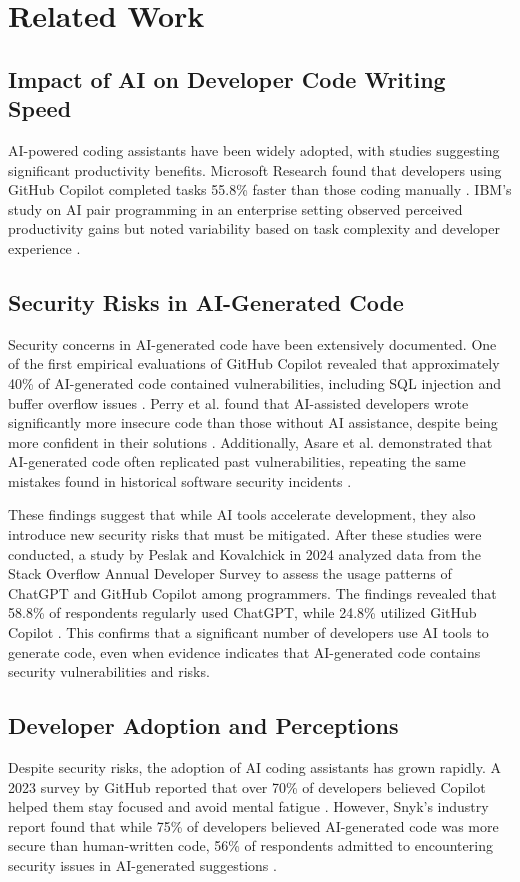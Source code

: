 \section{Related Work}

\subsection{Impact of AI on Developer Code Writing Speed}
AI-powered coding assistants have been widely adopted, with studies suggesting significant productivity benefits. Microsoft Research found that developers using GitHub Copilot completed tasks 55.8\% faster than those coding manually \cite{peng2023impact}. IBM’s study on AI pair programming in an enterprise setting observed perceived productivity gains but noted variability based on task complexity and developer experience \cite{weisz2025examining}.


\subsection{Security Risks in AI-Generated Code}
Security concerns in AI-generated code have been extensively documented. One of the first empirical evaluations of GitHub Copilot revealed that approximately 40\% of AI-generated code contained vulnerabilities, including SQL injection and buffer overflow issues \cite{fu2025security}. Perry et al. found that AI-assisted developers wrote significantly more insecure code than those without AI assistance, despite being more confident in their solutions \cite{perry2023}. Additionally, Asare et al. demonstrated that AI-generated code often replicated past vulnerabilities, repeating the same mistakes found in historical software security incidents \cite{asare2024}. 

These findings suggest that while AI tools accelerate development, they also introduce new security risks that must be mitigated. After these studies were conducted, a study by Peslak and Kovalchick in 2024 analyzed data from the Stack Overflow Annual Developer Survey to assess the usage patterns of ChatGPT and GitHub Copilot among programmers. The findings revealed that 58.8\% of respondents regularly used ChatGPT, while 24.8\% utilized GitHub Copilot \cite{peslak2024ai}. This confirms that a significant number of developers use AI tools to generate code, even when evidence indicates that AI-generated code contains security vulnerabilities and risks.

\subsection{Developer Adoption and Perceptions}
Despite security risks, the adoption of AI coding assistants has grown rapidly. A 2023 survey by GitHub reported that over 70\% of developers believed Copilot helped them stay focused and avoid mental fatigue \cite{githubSurvey}. However, Snyk’s industry report found that while 75\% of developers believed AI-generated code was more secure than human-written code, 56\% of respondents admitted to encountering security issues in AI-generated suggestions \cite{snyk2023}.

